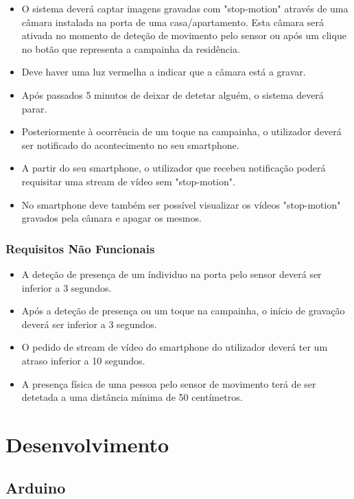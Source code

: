\documentclass{article}
\begin{document}
\begin{itemize}
    \item O sistema deverá captar imagens gravadas com "stop-motion" através de uma câmara instalada na porta de uma casa/apartamento. Esta câmara será ativada no momento de deteção de movimento pelo sensor ou após um clique no botão que representa a campainha da residência.
    \item Deve haver uma luz vermelha a indicar que a câmara está a gravar.
    \item Após passados 5 minutos de deixar de detetar alguém, o sistema deverá parar.
    \item Posteriormente à ocorrência de um toque na campainha, o utilizador deverá ser notificado do acontecimento no seu smartphone.
    \item A partir do seu smartphone, o utilizador que recebeu notificação poderá requisitar uma stream de vídeo sem "stop-motion".
    \item No smartphone deve também ser possível visualizar os vídeos "stop-motion" gravados pela câmara e apagar os mesmos.
\end{itemize}
\vspace{2mm}

\subsubsection{Requisitos Não Funcionais}
\vspace{2mm}

\begin{itemize}
    \item A deteção de presença de um índividuo na porta pelo sensor deverá ser inferior a 3 segundos.
    \item Após a deteção de presença ou um toque na campainha, o início de gravação deverá ser inferior a 3 segundos.
    \item O pedido de stream de vídeo do smartphone do utilizador deverá ter um atraso inferior a 10 segundos.
    \item A presença física de uma pessoa pelo sensor de movimento terá de ser detetada a uma distância mínima de 50 centímetros.
\end{itemize}
\fi

\section{Desenvolvimento}
\subsection{Arduino}
\end{document}
